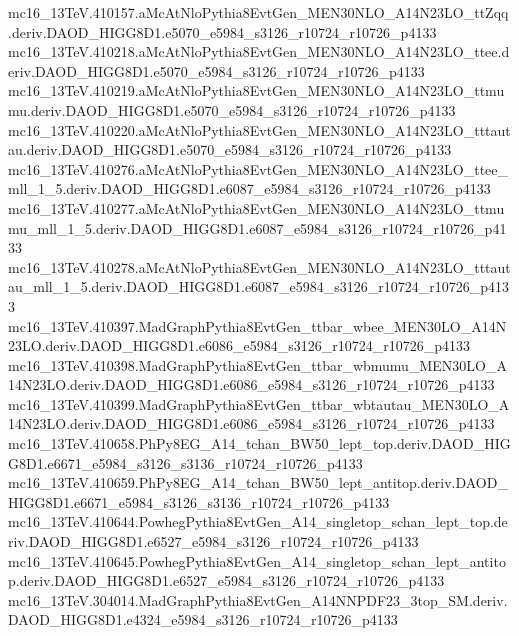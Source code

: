 \begin{footnotesize}
mc16\_13TeV.410157.aMcAtNloPythia8EvtGen\_MEN30NLO\_A14N23LO\_ttZqq.deriv.DAOD\_HIGG8D1.e5070\_e5984\_s3126\_r10724\_r10726\_p4133 \\
mc16\_13TeV.410218.aMcAtNloPythia8EvtGen\_MEN30NLO\_A14N23LO\_ttee.deriv.DAOD\_HIGG8D1.e5070\_e5984\_s3126\_r10724\_r10726\_p4133 \\
mc16\_13TeV.410219.aMcAtNloPythia8EvtGen\_MEN30NLO\_A14N23LO\_ttmumu.deriv.DAOD\_HIGG8D1.e5070\_e5984\_s3126\_r10724\_r10726\_p4133 \\
mc16\_13TeV.410220.aMcAtNloPythia8EvtGen\_MEN30NLO\_A14N23LO\_tttautau.deriv.DAOD\_HIGG8D1.e5070\_e5984\_s3126\_r10724\_r10726\_p4133 \\
mc16\_13TeV.410276.aMcAtNloPythia8EvtGen\_MEN30NLO\_A14N23LO\_ttee\_mll\_1\_5.deriv.DAOD\_HIGG8D1.e6087\_e5984\_s3126\_r10724\_r10726\_p4133 \\
mc16\_13TeV.410277.aMcAtNloPythia8EvtGen\_MEN30NLO\_A14N23LO\_ttmumu\_mll\_1\_5.deriv.DAOD\_HIGG8D1.e6087\_e5984\_s3126\_r10724\_r10726\_p4133 \\
mc16\_13TeV.410278.aMcAtNloPythia8EvtGen\_MEN30NLO\_A14N23LO\_tttautau\_mll\_1\_5.deriv.DAOD\_HIGG8D1.e6087\_e5984\_s3126\_r10724\_r10726\_p4133 \\
mc16\_13TeV.410397.MadGraphPythia8EvtGen\_ttbar\_wbee\_MEN30LO\_A14N23LO.deriv.DAOD\_HIGG8D1.e6086\_e5984\_s3126\_r10724\_r10726\_p4133 \\
mc16\_13TeV.410398.MadGraphPythia8EvtGen\_ttbar\_wbmumu\_MEN30LO\_A14N23LO.deriv.DAOD\_HIGG8D1.e6086\_e5984\_s3126\_r10724\_r10726\_p4133 \\
mc16\_13TeV.410399.MadGraphPythia8EvtGen\_ttbar\_wbtautau\_MEN30LO\_A14N23LO.deriv.DAOD\_HIGG8D1.e6086\_e5984\_s3126\_r10724\_r10726\_p4133 \\
mc16\_13TeV.410658.PhPy8EG\_A14\_tchan\_BW50\_lept\_top.deriv.DAOD\_HIGG8D1.e6671\_e5984\_s3126\_s3136\_r10724\_r10726\_p4133 \\
mc16\_13TeV.410659.PhPy8EG\_A14\_tchan\_BW50\_lept\_antitop.deriv.DAOD\_HIGG8D1.e6671\_e5984\_s3126\_s3136\_r10724\_r10726\_p4133 \\
mc16\_13TeV.410644.PowhegPythia8EvtGen\_A14\_singletop\_schan\_lept\_top.deriv.DAOD\_HIGG8D1.e6527\_e5984\_s3126\_r10724\_r10726\_p4133 \\
mc16\_13TeV.410645.PowhegPythia8EvtGen\_A14\_singletop\_schan\_lept\_antitop.deriv.DAOD\_HIGG8D1.e6527\_e5984\_s3126\_r10724\_r10726\_p4133 \\
mc16\_13TeV.304014.MadGraphPythia8EvtGen\_A14NNPDF23\_3top\_SM.deriv.DAOD\_HIGG8D1.e4324\_e5984\_s3126\_r10724\_r10726\_p4133 \\

\end{footnotesize}
